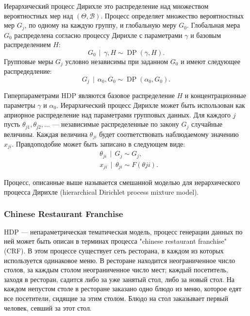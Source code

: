 \documentclass[12pt, a4paper]{article}
\newcommand\todo[1]{\marginpar{\textcolor{red}{#1}}}
\DeclareMathOperator{\DP}{DP}
\DeclareMathOperator{\svert}{\,\vert\,}
\begin{document}
  Иерархический процесс Дирихле это распределение над множеством вероятностных мер над $(\Theta, \mathcal{B})$. Процесс определяет множество вероятностных мер $G_j$, по одному на каждую группу, и глобальную меру $G_0$. Глобальная мера $G_0$ распределена согласно процессу Дирихле с параметрами $\gamma$ и базовым распределением $H$:
  \begin{equation}
  G_0 \svert \gamma, H \sim \DP(\gamma, H).
  \end{equation}
  Групповые меры $G_j$ условно независимы при заданном $G_0$ и имеют следующее распредедление:
  \begin{equation}
  G_j \svert \alpha_0, G_0 \sim \DP(\alpha_0, G_0).
  \end{equation}
  
  Гиперпараметрами HDP являются базовое распределение $H$ и концентрационные параметры $\gamma$ и $\alpha_0$.
  Иерархический процесс Дирихле может быть использован как априорное распределение над параметрами групповых данных. Для каждого $j$ пусть $\theta_{j1}, \theta_{j2}, \ldots$ --- независимые распределенные по закону $G_j$ случайные величины. Каждая величина $\theta_{ji}$ будет соответствовать наблюдаемому значению $x_{ji}$. Правдоподобие может быть записано в следующем виде:
  \begin{equation}
  \begin{aligned}
  & \theta_{ji} \svert G_j \sim G_j, \\
  & x_{ji} \svert \theta_{ji} \sim F(\theta{ji}).
  \end{aligned}
  \end{equation}
  
  Процесс, описанные выше называется смешанной моделью для иерархического процесса Дирихле (hierarchical Dirichlet process mixture model)\cite{hdp-1}.
  
  \subsubsection{Chinese Restaurant Franchise}

  
  HDP --- непараметрическая тематическая модель, процесс генерации данных по ней может быть описан в терминах процесса "chinese restaurant franchise" (CRF). В этом процессе существует сеть ресторана, в каждом из которых используется одинаковое меню. В ресторане находится неограниченное число столов, за каждым столом неограниченное число мест; каждый посетитель, заходя в ресторан, садится либо за уже занятый стол, либо за новый стол. На каждом непустом столе в ресторане заказано одно блюдо из меню, которое едят все посетители, сидящие за этим столом. Блюдо на стол заказывает первый человек, севший за этот стол.
  
\end{document}
